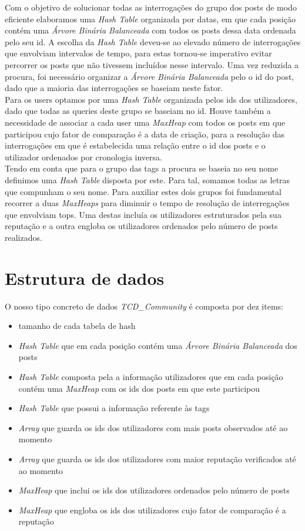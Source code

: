 \documentclass[10pt,a4paper]{article}
\begin{document}
 Com o objetivo de solucionar todas as interrogações do grupo dos posts de modo eficiente elaboramos uma 
\textit{Hash Table} organizada por datas, em que cada posição contém uma \textit{Árvore Binária Balanceada} com todos os posts dessa data ordenada pelo seu id. A escolha da \textit{Hash Table} deveu-se ao elevado número de interrogações que envolviam intervalos de tempo, para estas tornou-se imperativo evitar percorrer os posts que não tivessem incluídos nesse intervalo. Uma vez reduzida a procura, foi necessário organizar a \textit{Árvore Binária Balanceada} pelo o id do post, dado que a maioria das interrogações se baseiam neste fator.\\
 \indent Para os users optamos por uma \textit{Hash Table} organizada pelos ids dos utilizadores, dado que todas as queries deste grupo se baseiam no id. Houve também a necessidade de associar a cada user uma \textit{MaxHeap} com todos os posts em que participou cujo fator de comparação é a data de criação, para a resolução das interrogações em que é estabelecida uma relação entre o id dos posts e o utilizador ordenados por cronologia inversa.\\
 \indent Tendo em conta que para o grupo das tags a procura se baseia no seu nome definimos uma \textit{Hash Table} disposta por este. Para tal, somamos todas as letras que compunham o seu nome.
Para auxiliar estes dois grupos foi fundamental recorrer a duas \textit{MaxHeaps} para diminuir o tempo de resolução de interregações que envolviam tops. Uma destas incluía os utilizadores estruturados pela sua reputação e a outra engloba os utilizadores ordenados pelo número de posts realizados.
\cleardoublepage

\section{Estrutura de dados}
\label{sec:solucao}
 \noindent O nosso tipo concreto de dados \textit{TCD\_Community} é composta por dez items:
\begin{itemize}
	 \item tamanho de cada tabela de hash
	 \item \textit{Hash Table} que em cada posição contém uma \textit{Árvore Binária Balanceada} dos posts
	 \item \textit{Hash Table} composta pela a informação utilizadores que em cada posição contém uma \textit{MaxHeap} com os ids dos posts em que este participou 
     \item \textit{Hash Table} que possui a informação referente às tags
	 \item \textit{Array} que guarda os ids dos utilizadores com mais posts observados até ao momento
	 \item \textit{Array} que guarda os ids dos utilizadores com maior reputação verificados até ao momento 
	 \item \textit{MaxHeap} que inclui os ids dos utilizadores ordenados pelo número de posts 
	 \item \textit{MaxHeap} que engloba os ids dos utilizadores cujo fator de comparação é a reputação
\end{itemize}
\end{document}
